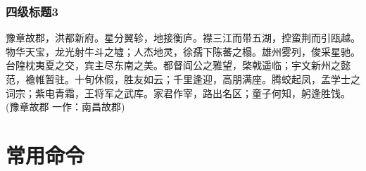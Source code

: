 \subsubsection{四级标题3}
豫章故郡，洪都新府。星分翼轸，地接衡庐。襟三江而带五湖，控蛮荆而引瓯越。物华天宝，龙光射牛斗之墟；人杰地灵，徐孺下陈蕃之榻。雄州雾列，俊采星驰。台隍枕夷夏之交，宾主尽东南之美。都督阎公之雅望，棨戟遥临；宇文新州之懿范，襜帷暂驻。十旬休假，胜友如云；千里逢迎，高朋满座。腾蛟起凤，孟学士之词宗；紫电青霜，王将军之武库。家君作宰，路出名区；童子何知，躬逢胜饯。(豫章故郡 一作：南昌故郡)
\section{常用命令}
